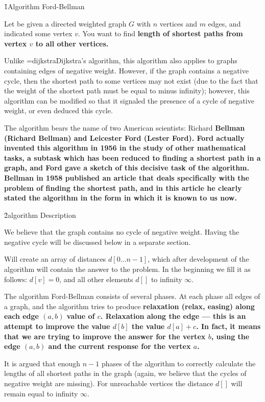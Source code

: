 \h1{Algorithm Ford-Bellman}

Let be given a directed weighted graph $G$ with $n$ vertices and $m$ edges, and indicated some vertex $v$. You want to find \bf{length of shortest paths} from vertex $v$ to all other vertices.

Unlike \algohref=dijkstra{Dijkstra's algorithm}, this algorithm also applies to graphs containing edges of negative weight. However, if the graph contains a negative cycle, then the shortest path to some vertices may not exist (due to the fact that the weight of the shortest path must be equal to minus infinity); however, this algorithm can be modified so that it signaled the presence of a cycle of negative weight, or even deduced this cycle.

The algorithm bears the name of two American scientists: Richard \bf{Bellman} (Richard Bellman) and Leicester \bf{Ford} (Lester Ford). Ford actually invented this algorithm in 1956 in the study of other mathematical tasks, a subtask which has been reduced to finding a shortest path in a graph, and Ford gave a sketch of this decisive task of the algorithm. Bellman in 1958 published an article that deals specifically with the problem of finding the shortest path, and in this article he clearly stated the algorithm in the form in which it is known to us now.


\h2{algorithm Description}

We believe that the graph contains no cycle of negative weight. Having the negative cycle will be discussed below in a separate section.

Will create an array of distances $d[0 \ldots n-1]$, which after development of the algorithm will contain the answer to the problem. In the beginning we fill it as follows: $d[v] = 0$, and all other elements $d[]$ to infinity $\infty$.

The algorithm Ford-Bellman consists of several phases. At each phase all edges of a graph, and the algorithm tries to produce \bf{relaxation} (relax, easing) along each edge $(a,b)$ value of $c$. Relaxation along the edge --- this is an attempt to improve the value $d[b]$ the value $d[a] + c$. In fact, it means that we are trying to improve the answer for the vertex $b$, using the edge $(a,b)$ and the current response for the vertex $a$.

It is argued that enough $n-1$ phases of the algorithm to correctly calculate the lengths of all shortest paths in the graph (again, we believe that the cycles of negative weight are missing). For unreachable vertices the distance $d[]$ will remain equal to infinity $\infty$.



